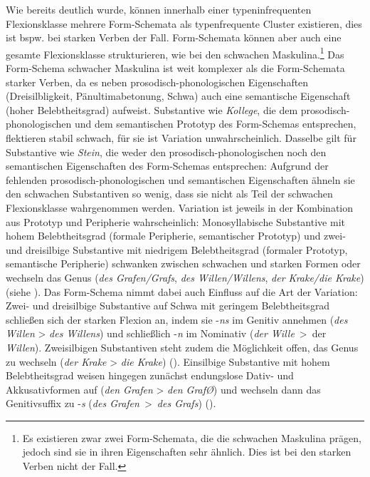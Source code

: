Wie bereits deutlich wurde, können innerhalb einer typeninfrequenten Flexionsklasse mehrere Form-Schemata als typenfrequente Cluster existieren, dies ist bspw. bei starken Verben der Fall. Form-Schemata können aber auch eine gesamte Flexionsklasse strukturieren, wie bei den schwachen Maskulina.\footnote{Es existieren zwar zwei Form-Schemata, die die schwachen Maskulina prägen, jedoch sind sie in ihren Eigenschaften sehr ähnlich. Dies ist bei den starken Verben nicht der Fall.} Das Form-Schema schwacher Maskulina ist weit komplexer als die Form-Schemata starker Verben, da es neben prosodisch-phonologischen Eigenschaften (Dreisilbligkeit, Pänultimabetonung, Schwa) auch eine semantische Eigenschaft (hoher Belebtheitsgrad) aufweist. Substantive wie \textit{Kollege}, die dem prosodisch-phonologischen und dem semantischen Prototyp des Form-Schemas entsprechen, flektieren stabil schwach, für sie ist Variation unwahrscheinlich. Dasselbe gilt für Substantive wie \textit{Stein}, die weder den prosodisch-phonologischen noch den semantischen Eigenschaften des Form-Schemas entsprechen: Aufgrund der fehlenden prosodisch-phono\-logischen und semantischen Eigenschaften ähneln sie den schwachen Substantiven so wenig, dass sie nicht als Teil der schwachen Fle\-xions\-klas\-se wahrgenommen werden. Variation ist jeweils in der Kombination aus Prototyp und Peripherie wahrscheinlich: Monosyllabische Substantive mit hohem Belebtheitsgrad (formale Peripherie, semantischer Prototyp) und zwei- und dreisilbige Substantive mit niedrigem Belebtheitsgrad (formaler Prototyp, semantische Peripherie) schwanken zwischen schwachen und starken Formen oder wechseln das Genus (\textit{des Grafen/Grafs}, \textit{des Willen/Willens}, \textit{der Krake/die Krake}) (siehe ). Das Form-Schema nimmt dabei auch Einfluss auf die Art der Variation: Zwei- und dreisilbige Substantive auf Schwa mit geringem Belebtheitsgrad schließen sich der starken Flexion an, indem sie -\textit{ns} im Genitiv annehmen (\textit{des Willen} > \textit{des Willens}) und schließlich -\textit{n} im Nominativ (\textit{der Wille}~>~der \textit{Willen}). Zweisilbigen Substantiven steht zudem die Möglichkeit offen, das Genus zu wechseln (\textit{der Krake} > \textit{die Krake}) (\cite[108--109]{Kopcke.2000}). Einsilbige Substantive mit hohem Belebtheitsgrad weisen hingegen zunächst endungslose Dativ- und Akkusativformen auf (\textit{den Grafen} > \textit{den GrafØ}) und wechseln dann das Genitivsuffix zu -\textit{s} (\textit{des Grafen}~>~\textit{des Grafs}) (\cite[108--109]{Kopcke.2000}). 


